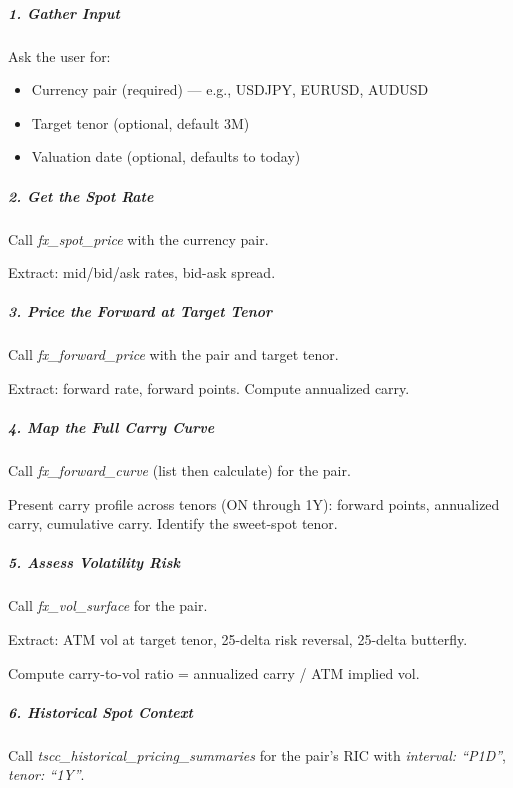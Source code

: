\documentclass[11pt]{article}
\begin{document}
\subparagraph{1. Gather Input}\mbox{}\par

Ask the user for:

\begin{itemize}[leftmargin=*,itemsep=2pt,topsep=2pt]
\item {} Currency pair (required) — e.g., USDJPY, EURUSD, AUDUSD
\item {} Target tenor (optional, default 3M)
\item {} Valuation date (optional, defaults to today)
\end{itemize}

\subparagraph{2. Get the Spot Rate}\mbox{}\par

Call \emph{fx\_\allowbreak{}spot\_\allowbreak{}price} with the currency pair.


Extract: mid/bid/ask rates, bid-ask spread.


\subparagraph{3. Price the Forward at Target Tenor}\mbox{}\par

Call \emph{fx\_\allowbreak{}forward\_\allowbreak{}price} with the pair and target tenor.


Extract: forward rate, forward points. Compute annualized carry.


\subparagraph{4. Map the Full Carry Curve}\mbox{}\par

Call \emph{fx\_\allowbreak{}forward\_\allowbreak{}curve} (list then calculate) for the pair.


Present carry profile across tenors (ON through 1Y): forward points, annualized carry, cumulative carry. Identify the sweet-spot tenor.


\subparagraph{5. Assess Volatility Risk}\mbox{}\par

Call \emph{fx\_\allowbreak{}vol\_\allowbreak{}surface} for the pair.


Extract: ATM vol at target tenor, 25-delta risk reversal, 25-delta butterfly.


Compute carry-to-vol ratio = annualized carry / ATM implied vol.


\subparagraph{6. Historical Spot Context}\mbox{}\par

Call \emph{tscc\_\allowbreak{}historical\_\allowbreak{}pricing\_\allowbreak{}summaries} for the pair's RIC with \emph{interval: ``P1D''}, \emph{tenor: ``1Y''}.
\end{document}
